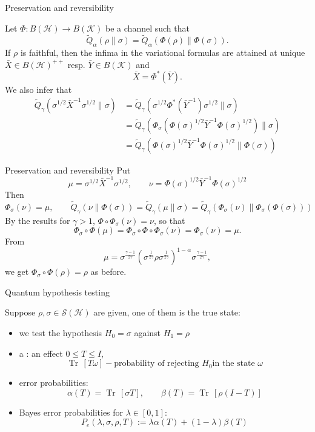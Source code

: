 \documentclass[mathserif]{beamer}
\newcommand{\<}{\langle}
\renewcommand{\>}{\rangle}
\newcommand{\Tr}{\operatorname{Tr}\,}
\newcommand{\Se}{\mathcal S}
\newcommand{\Ha}{\mathcal H}
\newcommand{\Ka}{\mathcal K}
\begin{document}
\begin{frame}{Preservation and reversibility}

Let $\Phi: B(\Ha)\to B(\Ka)$ be a channel such that
\[
\tilde Q_\alpha(\rho\|\sigma)= \tilde Q_\alpha(\Phi(\rho)\|\Phi(\sigma)).
\]
If $\rho$ is faithful, then the infima in the variational formulas are
attained at unique  $\bar X\in B(\Ha)^{++}$ resp.  $\bar Y\in B(\Ka)$ and 
\[
\bar X=\Phi^*(\bar Y).
\]
We also infer that
\begin{align*}
\tilde Q_\gamma(\sigma^{1/2}\bar X^{-1}\sigma^{1/2}\|\sigma)&=
\tilde
Q_\gamma(\sigma^{1/2}\Phi^*(\bar Y^{-1})\sigma^{1/2}\|\sigma)\\ &=\tilde
Q_\gamma(\Phi_\sigma(\Phi(\sigma)^{1/2}\bar Y^{-1}\Phi(\sigma)^{1/2})\|\sigma)\\
&= \tilde
Q_\gamma(\Phi(\sigma)^{1/2}\bar Y^{-1}\Phi(\sigma)^{1/2}\|\Phi(\sigma))
\end{align*}






\end{frame}


\begin{frame}{Preservation and reversibility}
Put
\[
\mu=\sigma^{1/2}\bar X^{-1}\sigma^{1/2},\qquad \nu=\Phi(\sigma)^{1/2}\bar
Y^{-1}\Phi(\sigma)^{1/2}
\]
Then
\[
\Phi_\sigma(\nu)=\mu,\qquad \tilde Q_\gamma(\nu\|\Phi(\sigma))=\tilde
Q_\gamma(\mu\|\sigma)=\tilde Q_\gamma(\Phi_\sigma(\nu)\|\Phi_\sigma(\Phi(\sigma)))
\]
By the results for $\gamma>1$, $\Phi\circ \Phi_\sigma(\nu)=\nu$, so that 
\[
\Phi_\sigma\circ \Phi(\mu)=\Phi_\sigma\circ\Phi\circ\Phi_\sigma(\nu)=\Phi_\sigma(\nu)=\mu.
\]
From
\[
\mu=\sigma^{\frac{\gamma-1}{2\gamma}}\left(\sigma^{\frac{1}{2\gamma}}\rho\sigma^{\frac{1}{2\gamma}}\right)^{1-\alpha}\sigma^{\frac{\gamma-1}{2\gamma}},
\]
we get $\Phi_\sigma\circ \Phi(\rho)=\rho$ as before.


\end{frame}





\begin{frame}{Quantum hypothesis testing}

Suppose $\rho,\sigma\in \Se(\Ha)$ are given, one of them is the true state:


\bigskip

\begin{itemize}
\item we test the hypothesis $H_0=\sigma$ against $H_1=\rho$
\item a : an effect $0\le T\le I$, 
\[
\Tr[T\omega] - \text{probability of rejecting $H_0$
in the state $\omega$}
\]
\item error probabilities: 
\[
\alpha(T)=\Tr[\sigma T],\qquad \beta(T)= \Tr[\rho(I-T)]
\]
\item  Bayes error probabilities for $\lambda\in [0,1]$: 
\[
P_e(\lambda,\sigma,\rho,T):=\lambda\alpha(T)+(1-\lambda)\beta(T)
\]
\end{itemize}


\end{frame}
\end{document}
